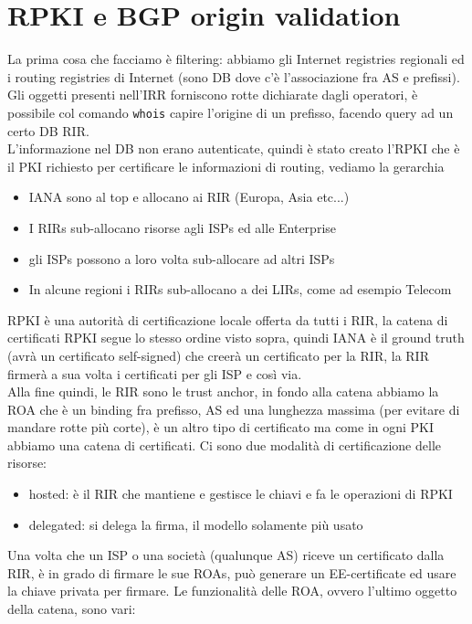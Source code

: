 \documentclass[12pt, oneside]{extbook} %
\begin{document}
\section{RPKI e BGP origin validation}
La prima cosa che facciamo è filtering: abbiamo gli Internet registries regionali ed i routing registries di Internet (sono DB dove c'è l'associazione fra AS e prefissi).\\Gli oggetti presenti nell'IRR forniscono rotte dichiarate dagli operatori, è possibile col comando \texttt{whois} capire l'origine di un prefisso, facendo query ad un certo DB RIR.\\L'informazione nel DB non erano autenticate, quindi è stato creato l'RPKI che è il PKI richiesto per certificare le informazioni di routing, vediamo la gerarchia
\begin{itemize}
\item IANA sono al top e allocano ai RIR (Europa, Asia etc...)
\item I RIRs sub-allocano risorse agli ISPs ed alle Enterprise
\item gli ISPs possono a loro volta sub-allocare ad altri ISPs
\item In alcune regioni i RIRs sub-allocano a dei LIRs, come ad esempio Telecom
\end{itemize}
RPKI è una autorità di certificazione locale offerta da tutti i RIR, la catena di certificati RPKI segue lo stesso ordine visto sopra, quindi IANA è il ground truth (avrà un certificato self-signed) che creerà un certificato per la RIR, la RIR firmerà a sua volta i certificati per gli ISP e così via.\\Alla fine quindi, le RIR sono le trust anchor, in fondo alla catena abbiamo la ROA che è un binding fra prefisso, AS ed una lunghezza massima (per evitare di mandare rotte più corte), è un altro tipo di certificato ma come in ogni PKI abbiamo una catena di certificati. Ci sono due modalità di certificazione delle risorse:
\begin{itemize}
\item hosted: è il RIR che mantiene e gestisce le chiavi e fa le operazioni di RPKI 
\item delegated: si delega la firma, il modello solamente più usato
\end{itemize}
Una volta che un ISP o una società (qualunque AS) riceve un certificato dalla RIR, è in grado di firmare le sue ROAs, può generare un EE-certificate ed usare la chiave privata per firmare. Le funzionalità delle ROA, ovvero l'ultimo oggetto della catena, sono vari:
\end{document}
